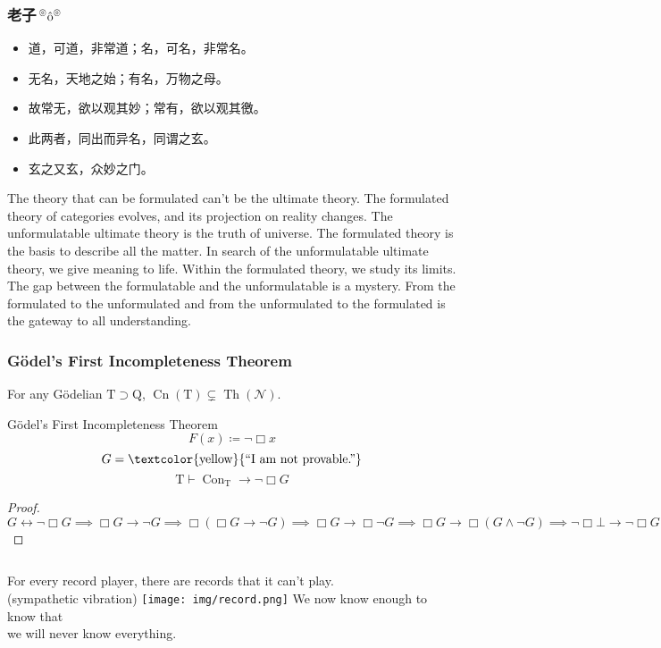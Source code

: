 \documentclass[UTF8,11pt,colorlinks,compress,openany]{beamer}%
\begin{document}
\begin{frame}\frametitle{老子$\sideset{^\circledcirc}{^\circledcirc}{\operatorname{\hat{o}}}$}
\begin{itemize}
	\item 道，可道，非常道；名，可名，非常名。
	\item 无名，天地之始；有名，万物之母。
	\item 故常无，欲以观其妙；常有，欲以观其徼。
	\item 此两者，同出而异名，同谓之玄。
	\item 玄之又玄，众妙之门。
\end{itemize}
\begin{block}{}
	The theory that can be formulated can't be the ultimate theory. The formulated theory of categories evolves, and its projection on reality changes. The unformulatable ultimate theory is the truth of universe. The formulated theory is the basis to describe all the matter. In search of the unformulatable ultimate theory, we give meaning to life. Within the formulated theory, we study its limits. The gap between the formulatable and the unformulatable is a mystery. From the formulated to the unformulated and from the unformulated to the formulated is the gateway to all understanding.
\end{block}
\end{frame}

\begin{frame}\frametitle{G\"odel's First Incompleteness Theorem}
\setlength\abovedisplayskip{0pt}
\setlength\belowdisplayskip{0pt}
	\begin{theorem}
		For any G\"odelian $\mathrm{T}\supset \mathrm{Q}$, $\operatorname{Cn}(\mathrm{T})\subsetneq \operatorname{Th}(\mathcal{N})$.
	\end{theorem}
	\begin{block}{G\"odel's First Incompleteness Theorem}
		\[F(x)\coloneqq \neg\Box x\]
		\[G=\text{\textcolor{yellow}{``I am not provable.''}}\]
		\[\mathrm{T}\vdash\operatorname{Con}_\mathrm{T}\to\neg\Box G\]
	\end{block}
\begin{proof}
$G\leftrightarrow\neg\Box G\implies\Box G\to\neg G\implies\Box(\Box G\to\neg G)\implies\Box G\to\Box\neg G\implies\Box G\to\Box(G\wedge\neg G)\implies\neg\Box\bot\to\neg\Box G$
\end{proof}
\begin{columns}
	{\footnotesize For every record player, there are records that it can't play.\\(sympathetic vibration)}
		\texttt{[image: img/record.png]}
	{\large We now know enough to know that\\ we will never know everything.}
\end{columns}
\end{frame}
\end{document}
